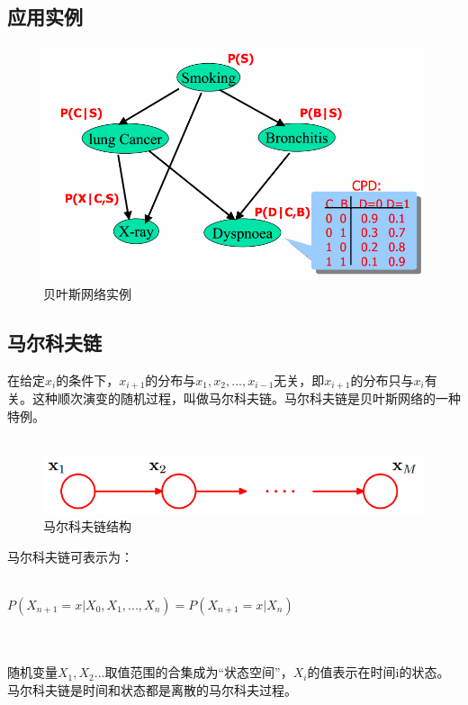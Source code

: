 \subsection*{应用实例}
\begin{frame}
\begin{figure}
		\centering
		\includegraphics[scale=0.3]{pic/instance.png}
		\caption{贝叶斯网络实例}
		\label{0-005}
\end{figure}
\end{frame}

\subsection*{马尔科夫链}
\begin{frame}
	在给定$x_i$的条件下，$x_{i+1}$的分布与$x_1,x_2,...,x_{i-1}$无关，即$x_{i+1}$的分布只与$x_i$有关。这种顺次演变的随机过程，叫做马尔科夫链。马尔科夫链是贝叶斯网络的一种特例。
	~\\
	~\\
	\begin{figure}
		\centering
		\includegraphics[scale=0.4]{pic/markov.png}
		\caption{马尔科夫链结构}
		\label{0-006}
	\end{figure}
\end{frame}

\begin{frame}
	马尔科夫链可表示为：
	~\\
	~\\
	\centerline{{\large $P(X_{n+1}=x|X_0,X_1,...,X_n)=P(X_{n+1}=x|X_n)$}}
	~\\
	~\\
	随机变量$X_1,X_2...$取值范围的合集成为“状态空间”，$X_i$的值表示在时间i的状态。马尔科夫链是时间和状态都是离散的马尔科夫过程。
\end{frame}

